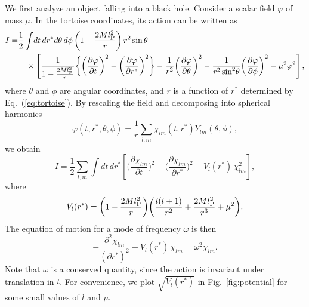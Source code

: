 \documentclass[12pt]{article}
\begin{document}
We first analyze an object falling into a black hole.  Consider a 
scalar field $\varphi$ of mass $\mu$.  In the tortoise coordinates, 
its action can be written as
%
\begin{align}
  I =& \frac{1}{2} \int\!dt\, dr^* d\theta\, d\phi\, 
    \biggl( 1 - \frac{2 M l_{\rm P}^2}{r} \biggr)\, r^2 \sin\theta 
\nonumber\\
  &\quad \times \left[ \frac{1}{1 - \frac{2 M l_{\rm P}^2}{r}} 
      \biggl\{ \biggl( \frac{\partial \varphi}{\partial t} \biggr)^2 
      - \biggl( \frac{\partial \varphi}{\partial r^*} \biggr)^2 
        \biggr\} - \frac{1}{r^2} 
      \biggl( \frac{\partial \varphi}{\partial \theta} \biggr)^2 
      - \frac{1}{r^2 \sin^2\!\theta} 
      \biggl( \frac{\partial \varphi}{\partial \phi} \biggr)^2 
      - \mu^2 \varphi^2 \right],
\label{eq:I_phi}
\end{align}
%
where $\theta$ and $\phi$ are angular coordinates, and $r$ is 
a function of $r^*$ determined by Eq.~(\ref{eq:tortoise}).  By 
rescaling the field and decomposing into spherical harmonics
%
\begin{equation}
  \varphi(t,r^*,\theta,\phi) 
  = \frac{1}{r} \sum_{l,m} \chi_{lm}(t,r^*) Y_{lm}(\theta,\phi),
\label{eq:decomp}
\end{equation}
%
we obtain
%
\begin{equation}
  I = \frac{1}{2} \sum_{l,m} \int\!dt\, dr^* 
    \left[ \biggl( \frac{\partial \chi_{lm} }{\partial t} \biggr)^2 
      - \biggl( \frac{\partial \chi_{lm}}{\partial r^*} \biggr)^2 
        - V_l(r^*)\, \chi_{lm}^2 \right],
\label{eq:I_chi}
\end{equation}
%
where
%
\begin{equation}
  V_l(r^*) = \biggl( 1 - \frac{2 M l_{\rm P}^2}{r} \biggr) 
    \biggl( \frac{l(l+1)}{r^2} + \frac{2 M l_{\rm P}^2}{r^3} 
    + \mu^2 \biggr).
\label{eq:V_l}
\end{equation}
%
The equation of motion for a mode of frequency $\omega$ is then
%
\begin{equation}
  -\frac{\partial^2 \chi_{lm}}{(\partial r^*)^2} + 
    V_l(r^*)\, \chi_{lm} = \omega^2 \chi_{lm}.
\label{eq:eom}
\end{equation}
%
Note that $\omega$ is a conserved quantity, since the action is 
invariant under translation in $t$.  For convenience, we plot 
$\sqrt{V_l(r^*)}$ in Fig.~\ref{fig:potential} for some small 
values of $l$ and $\mu$.
%
\end{document}
